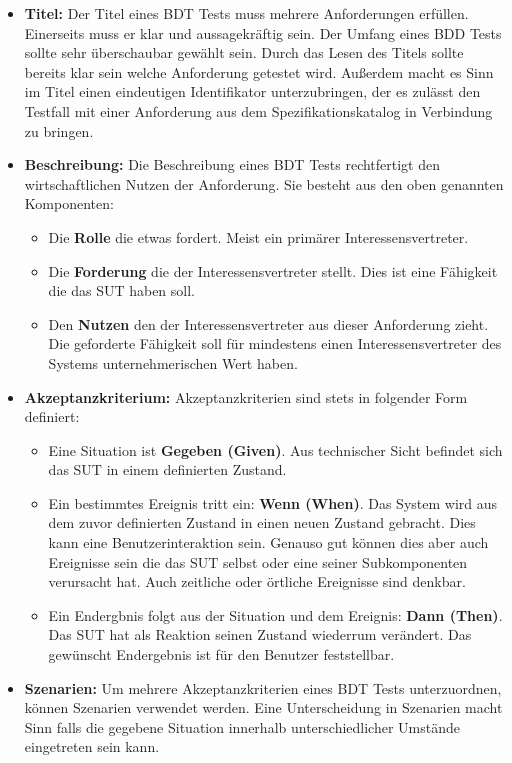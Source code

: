 \begin{itemize}
\item \textbf{Titel:} Der Titel eines \Gls{BDT} Tests muss mehrere Anforderungen erfüllen. Einerseits muss er klar und aussagekräftig sein. Der Umfang eines BDD Tests sollte sehr überschaubar gewählt sein. Durch das Lesen des Titels sollte bereits klar sein welche Anforderung getestet wird. Außerdem macht es Sinn im Titel einen eindeutigen Identifikator unterzubringen, der es zulässt den Testfall mit einer Anforderung aus dem Spezifikationskatalog in Verbindung zu bringen.
\item \textbf{Beschreibung:} Die Beschreibung eines \Gls{BDT} Tests rechtfertigt den wirtschaftlichen Nutzen der Anforderung. Sie besteht aus den oben genannten Komponenten:

\begin{itemize}
\item Die \textbf{Rolle} die etwas fordert. Meist ein primärer Interessensvertreter.
\item Die \textbf{Forderung} die der Interessensvertreter stellt. Dies ist eine Fähigkeit die das \Gls{SUT} haben soll.
\item Den \textbf{Nutzen} den der Interessensvertreter aus dieser Anforderung zieht. Die geforderte Fähigkeit soll für mindestens einen Interessensvertreter des Systems unternehmerischen Wert haben.
\end{itemize}

\item \textbf{Akzeptanzkriterium:} Akzeptanzkriterien sind stets in folgender Form definiert:
\begin{itemize}
\item Eine Situation ist \textbf{Gegeben (Given)}. Aus technischer Sicht befindet sich das \Gls{SUT} in einem definierten Zustand.
\item Ein bestimmtes Ereignis tritt ein: \textbf{Wenn (When)}. Das System wird aus dem zuvor definierten Zustand in einen neuen Zustand gebracht. Dies kann eine Benutzerinteraktion sein. Genauso gut können dies aber auch Ereignisse sein die das \Gls{SUT} selbst oder eine seiner Subkomponenten verursacht hat. Auch zeitliche oder örtliche Ereignisse sind denkbar.
\item Ein Endergbnis folgt aus der Situation und dem Ereignis: \textbf{Dann (Then)}. Das \Gls{SUT} hat als Reaktion seinen Zustand wiederrum verändert. Das gewünscht Endergebnis ist für den Benutzer feststellbar.
\end{itemize}

\item \textbf{Szenarien:} Um mehrere Akzeptanzkriterien eines \Gls{BDT} Tests unterzuordnen, können Szenarien verwendet werden. Eine Unterscheidung in Szenarien macht Sinn falls die gegebene Situation innerhalb unterschiedlicher Umstände eingetreten sein kann.
\end{itemize}


